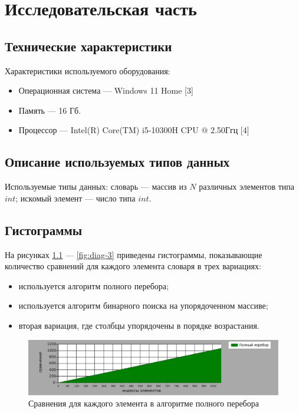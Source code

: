 \chapter{Исследовательская часть}

\section{Технические характеристики}
Характеристики используемого оборудования:
\begin{itemize}
    \item Операционная система --- Windows 11 Home [3]
    \item Память --- 16 Гб.
    \item Процессор --- Intel(R) Core(TM) i5-10300H CPU @ 2.50Ггц [4]
\end{itemize}

\section{Описание используемых типов данных}
Используемые типы данных:
словарь --- массив из $N$ различных элементов типа $int$;
искомый элемент --- число типа $int$.


\section{Гистограммы}

На рисунках \ref{fig:diag-1} --- \ref{fig:diag-3} приведены гистограммы, показывающие количество сравнений для каждого элемента словаря в трех вариациях:
\begin{itemize}
    \item используется алгоритм полного перебора;
    \item используется алгоритм бинарного поиска на упорядоченном массиве;
    \item вторая вариация, где столбцы упорядочены в порядке возрастания.
\end{itemize}

\begin{figure}
    \centering
    \includegraphics[width=1\linewidth]{img/chart1.eps}
    \caption{Сравнения для каждого элемента в алгоритме полного перебора}
    \label{fig:diag-1}
\end{figure}

